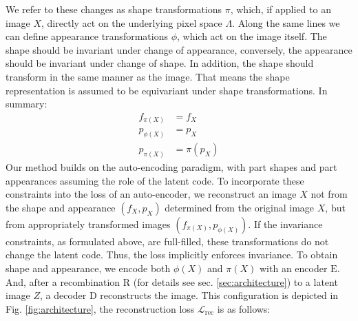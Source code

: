 	We refer to these changes as shape transformations $\pi$, which, if applied to an image $X$, directly act on the underlying pixel space $\Lambda$.
	Along the same lines we can define appearance transformations $\phi$, which act on the image itself.
	The shape should be invariant under change of appearance, conversely, the appearance should be invariant under change of shape.
	In addition, the shape should transform in the same manner as the image.
	That means the shape representation is assumed to be equivariant under shape transformations.
	In summary:
	\begin{align}
		f_{\pi(X)}  &= f_{X} \tag{invariance of appearance}\\
		p_{\phi(X)} &= p_X  \tag{invariance of shape}\\
		p_{\pi(X)} &= \pi(p_X) \tag{equivariance of shape}
	\label{eq:invar}
	\end{align} %
	Our method builds on the auto-encoding paradigm, with part shapes and part appearances assuming the role of the latent code.
	To incorporate these constraints into the loss of an auto-encoder, we reconstruct an image $X$ not from the shape and appearance $(f_X, p_X)$ determined from the original image $X$, but from appropriately transformed images $(f_{\pi(X)}, p_{\phi(X)})$.
	If the invariance constraints, as formulated above, are full-filled, these transformations do not change the latent code.
	Thus, the loss implicitly enforces invariance.
	To obtain shape and appearance, we encode both $\phi(X)$ and $\pi(X)$ with an encoder $\mathrm{E}$.
	And, after a recombination $\mathrm{R}$ (for details see sec. \ref{sec:architecture}) to a latent image $Z$, a decoder $\mathrm{D}$ reconstructs the image.
	This configuration is depicted in Fig. \ref{fig:architecture}, the reconstruction loss $\mathcal{L}_{\textrm{rec}}$ is as follows:
